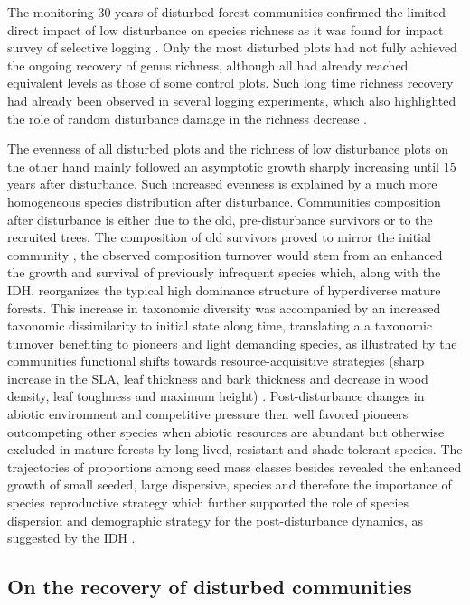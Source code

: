 \documentclass[fleqn,10pt]{ArtEcoFoG} %
\theoremstyle{definition}
\theoremstyle{definition}
\theoremstyle{definition}
\theoremstyle{remark}
\begin{document}
The monitoring 30 years of disturbed forest communities confirmed the
limited direct impact of low disturbance on species richness as it was
found for impact survey of selective logging
\citep{Cannon1998, Baraloto2012}. Only the most disturbed plots had not
fully achieved the ongoing recovery of genus richness, although all had
already reached equivalent levels as those of some control plots. Such
long time richness recovery had already been observed in several logging
experiments, which also highlighted the role of random disturbance
damage in the richness decrease \citep{deAvila2015, Hu2018}.

The evenness of all disturbed plots and the richness of low disturbance
plots on the other hand mainly followed an asymptotic growth sharply
increasing until 15 years after disturbance. Such increased evenness is
explained by a much more homogeneous species distribution after
disturbance. Communities composition after disturbance is either due to
the old, pre-disturbance survivors or to the recruited trees. The
composition of old survivors proved to mirror the initial community
\citep{Herault2018}, the observed composition turnover would stem from
an enhanced the growth and survival of previously infrequent species
which, along with the IDH, reorganizes the typical high dominance
structure of hyperdiverse mature forests. This increase in taxonomic
diversity was accompanied by an increased taxonomic dissimilarity to
initial state along time, translating a a taxonomic turnover benefiting
to pioneers and light demanding species, as illustrated by the
communities functional shifts towards resource-acquisitive strategies
(sharp increase in the SLA, leaf thickness and bark thickness and
decrease in wood density, leaf toughness and maximum height)
\citep{Westoby1998, Wright2004, Reich2014}. Post-disturbance changes in
abiotic environment and competitive pressure then well favored pioneers
outcompeting other species when abiotic resources are abundant but
otherwise excluded in mature forests by long-lived, resistant and shade
tolerant species. The trajectories of proportions among seed mass
classes besides revealed the enhanced growth of small seeded, large
dispersive, species and therefore the importance of species reproductive
strategy which further supported the role of species dispersion and
demographic strategy for the post-disturbance dynamics, as suggested by
the IDH \citep{TerSteege2001, Flores2006, Haddad2008}.

\subsection{On the recovery of disturbed
communities}\label{on-the-recovery-of-disturbed-communities}
\end{document}
